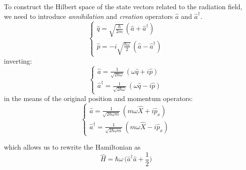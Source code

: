To construct the Hilbert space of the state vectors related to the radiation field, we need to introduce \emph{annihilation} and \emph{creation} operators $\hat{a}$ and $\hat{a}^\dagger$.
\begin{equation}\label{eqn:11-annihilation-creation-operators-1}
\begin{cases}
    \hat{q} =\sqrt{\frac{\hbar}{2m}}\, (\hat{a}+\hat{a}^\dagger)\\[0.5ex]
    \hat{p} = -i\sqrt{\frac{\hbar \omega }{2}}\, (\hat{a}-\hat{a}^\dagger)
\end{cases}
\end{equation}
inverting:
\begin{equation}\label{eqn:11-annihilation-creation-operators-2}
\begin{cases}
    \hat{a} =\frac{1}{\sqrt{2\hbar \omega}}\, (\omega \hat{q}+i\hat{p})\\[0.5ex]
    \hat{a}^\dagger = \frac{1}{\sqrt{2\hbar \omega}}\, (\omega\hat{q}-i\hat{p})
\end{cases}
\end{equation}
in the means of the original position and momentum operators:
\begin{equation}\label{eqn:11-annihilation-creation-operators-3}
\begin{cases}
    \hat{a} =\frac{1}{\sqrt{2\hbar \omega m}}\, (m\omega \hat{X}+i\hat{p}_x)\\[0.5ex]
    \hat{a}^\dagger = \frac{1}{\sqrt{2\hbar \omega m}}\, (m\omega\hat{X}-i\hat{p}_x)
\end{cases}
\end{equation}

which allows us to rewrite the Hamiltonian as
\begin{equation}\label{eqn:11-hamiltonian-annihilation-creation-operators}
\hat{H} = \hbar \omega \, 
\biggl(\hat{a}^\dagger \hat{a}+\frac{1}{2}\bigr)
\end{equation}

